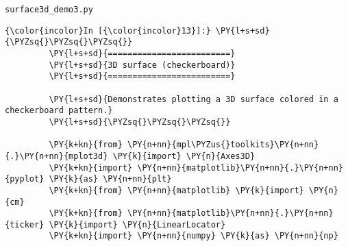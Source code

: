     
    \texttt{surface3d\_demo3.py}

    \begin{Verbatim}[commandchars=\\\{\}]
{\color{incolor}In [{\color{incolor}13}]:} \PY{l+s+sd}{\PYZsq{}\PYZsq{}\PYZsq{}}
         \PY{l+s+sd}{=========================}
         \PY{l+s+sd}{3D surface (checkerboard)}
         \PY{l+s+sd}{=========================}
         
         \PY{l+s+sd}{Demonstrates plotting a 3D surface colored in a checkerboard pattern.}
         \PY{l+s+sd}{\PYZsq{}\PYZsq{}\PYZsq{}}
         
         \PY{k+kn}{from} \PY{n+nn}{mpl\PYZus{}toolkits}\PY{n+nn}{.}\PY{n+nn}{mplot3d} \PY{k}{import} \PY{n}{Axes3D}
         \PY{k+kn}{import} \PY{n+nn}{matplotlib}\PY{n+nn}{.}\PY{n+nn}{pyplot} \PY{k}{as} \PY{n+nn}{plt}
         \PY{k+kn}{from} \PY{n+nn}{matplotlib} \PY{k}{import} \PY{n}{cm}
         \PY{k+kn}{from} \PY{n+nn}{matplotlib}\PY{n+nn}{.}\PY{n+nn}{ticker} \PY{k}{import} \PY{n}{LinearLocator}
         \PY{k+kn}{import} \PY{n+nn}{numpy} \PY{k}{as} \PY{n+nn}{np}
\end{Verbatim}


